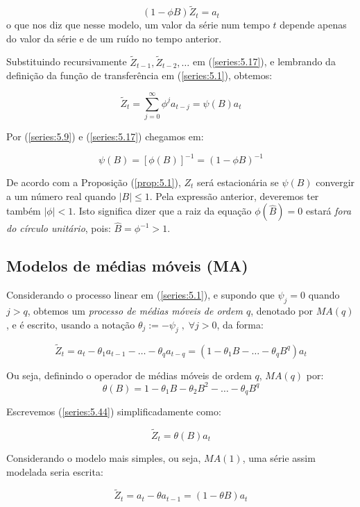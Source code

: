 \[
(1 - \phi B)\tilde{Z}_t = a_t
\]
o que nos diz que nesse modelo, um valor da série num tempo $t$ depende apenas do valor da série e de um ruído no tempo anterior.

Substituindo recursivamente $\tilde{Z}_{t-1}, \tilde{Z}_{t-2}, \ldots$ em (\ref{series:5.17}), e lembrando da definição da função de transferência em (\ref{series:5.1}), obtemos:

\[
\tilde{Z}_t = \sum_{j=0}^\infty \phi^j a_{t-j} = \psi(B)a_t
\]

Por (\ref{series:5.9}) e (\ref{series:5.17}) chegamos em:

\[
\psi(B) = [\phi(B)]^{-1} = (1 - \phi B)^{-1}
\]

De acordo com a Proposição (\ref{prop:5.1}), $Z_t$ será estacionária se $\psi(B)$ convergir a um número real quando $|B| \leq 1$. Pela expressão anterior, deveremos ter também $|\phi| < 1$. Isto significa dizer que a raiz da equação $\phi(\hat{B}) = 0$ estará \emph{fora do círculo unitário}, pois: $\hat{B} = \phi^{-1} > 1$.


\subsection{Modelos de médias móveis (MA)}

Considerando o processo linear em (\ref{series:5.1}), e supondo que $\psi_j = 0$ quando $j > q$, obtemos um \emph{processo de médias móveis de ordem $q$}, denotado por $MA(q)$, e é escrito, usando a notação $\theta_j := -\psi_j\;, \; \forall j>0$, da forma:

\begin{equation}\label{series:5.44}
\tilde{Z}_t = a_t - \theta_1 a_{t-1} - \ldots - \theta_q a_{t-q} = (1 - \theta_1 B - \ldots - \theta_q B^q)a_t 
\end{equation}

Ou seja, definindo o operador de médias móveis de ordem $q$, $MA(q)$ por:
\[
\theta(B) = 1 - \theta_1 B - \theta_2 B^2 - \ldots - \theta_q B^q
\]

Escrevemos (\ref{series:5.44}) simplificadamente como:

\begin{equation}\label{series:5.45}
\tilde{Z}_t = \theta(B) a_t 
\end{equation}

Considerando o modelo mais simples, ou seja, $MA(1)$, uma série assim modelada seria escrita:

\[
\tilde{Z}_t = a_t - \theta a_{t-1} = (1 - \theta B)a_t
\]

